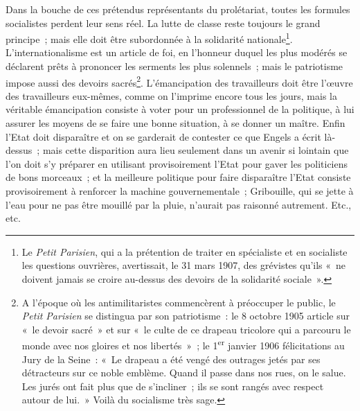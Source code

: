 \documentclass[french,twoside]{book} %
\begin{document}
Dans la bouche de ces prétendus représentants du prolétariat, toutes les formules socialistes perdent leur sens réel. La lutte de classe reste toujours le grand principe ; mais elle doit être subordonnée à la solidarité nationale\footnote{ \noindent Le \emph{Petit Parisien}, qui a la prétention de traiter en spécialiste et en socialiste les questions ouvrières, avertissait, le 31 mars 1907, des grévistes qu’ils « ne doivent jamais se croire au-dessus des devoirs de la solidarité sociale ».
 }. L’internationalisme est un article de foi,  en l’honneur duquel les plus modérés se déclarent prêts à prononcer les serments les plus solennels ; mais le patriotisme impose aussi des devoirs sacrés\footnote{ \noindent A l’époque où les antimilitaristes commencèrent à préoccuper le public, le \emph{Petit Parisien} se distingua par son patriotisme : le 8 octobre 1905 article sur « le devoir sacré » et sur « le culte de ce drapeau tricolore qui a parcouru le monde avec nos gloires et nos libertés » ; le 1\textsuperscript{er} janvier 1906 félicitations au Jury de la Seine : « Le drapeau a été vengé des outrages jetés par ses détracteurs sur ce noble emblème. Quand il passe dans nos rues, on le salue. Les jurés ont fait plus que de s’incliner ; ils se sont rangés avec respect autour de lui. » Voilà du socialisme très sage.
 }. L’émancipation des travailleurs doit être l’œuvre des travailleurs eux-mêmes, comme on l’imprime encore tous les jours, mais la véritable émancipation consiste à voter pour un professionnel de la politique, à lui assurer les moyens de se faire une bonne situation, à se donner un maître. Enfin l’Etat doit disparaître et on se garderait de contester ce que Engels a écrit là-dessus ; mais cette disparition aura lieu seulement dans un avenir si lointain que l’on doit s’y préparer en utilisant provisoirement l’Etat pour gaver les politiciens de bons morceaux ; et la meilleure politique pour faire disparaître l’Etat consiste provisoirement à renforcer la machine gouvernementale ; Gribouille, qui se jette à l’eau pour ne pas être mouillé par la pluie, n’aurait pas raisonné autrement. Etc., etc.\par
\end{document}
